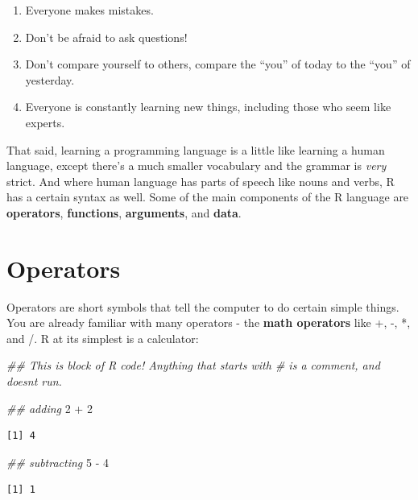 \documentclass[
  letterpaper,
  DIV=11,
  numbers=noendperiod]{scrreprt}
\newenvironment{Shaded}{\begin{snugshade}}{\end{snugshade}}
\newcommand{\DecValTok}[1]{\textcolor[rgb]{0.68,0.00,0.00}{#1}}
\newcommand{\DocumentationTok}[1]{\textcolor[rgb]{0.37,0.37,0.37}{\textit{#1}}}
\newcommand{\SpecialCharTok}[1]{\textcolor[rgb]{0.37,0.37,0.37}{#1}}
\providecommand{\tightlist}{%
  \setlength{\itemsep}{0pt}\setlength{\parskip}{0pt}}\usepackage{longtable,booktabs,array}
\begin{document}
\begin{enumerate}
\def\labelenumi{\arabic{enumi}.}
\tightlist
\item
  Everyone makes mistakes.
\item
  Don't be afraid to ask questions!
\item
  Don't compare yourself to others, compare the ``you'' of today to the
  ``you'' of yesterday.
\item
  Everyone is constantly learning new things, including those who seem
  like experts.
\end{enumerate}

That said, learning a programming language is a little like learning a
human language, except there's a much smaller vocabulary and the grammar
is \emph{very} strict. And where human language has parts of speech like
nouns and verbs, R has a certain syntax as well. Some of the main
components of the R language are \textbf{operators}, \textbf{functions},
\textbf{arguments}, and \textbf{data}.

\section{Operators}\label{operators}

Operators are short symbols that tell the computer to do certain simple
things. You are already familiar with many operators - the \textbf{math
operators} like +, -, *, and /. R at its simplest is a calculator:

\begin{Shaded}
\begin{Highlighting}[]
\DocumentationTok{\#\# This is block of R code! Anything that starts with \# is a comment, and doesn\textquotesingle{}t run.}

\DocumentationTok{\#\# adding}
\DecValTok{2} \SpecialCharTok{+} \DecValTok{2}
\end{Highlighting}
\end{Shaded}

\begin{verbatim}
[1] 4
\end{verbatim}

\begin{Shaded}
\begin{Highlighting}[]
\DocumentationTok{\#\# subtracting}
\DecValTok{5} \SpecialCharTok{{-}} \DecValTok{4}
\end{Highlighting}
\end{Shaded}

\begin{verbatim}
[1] 1
\end{verbatim}
\end{document}
